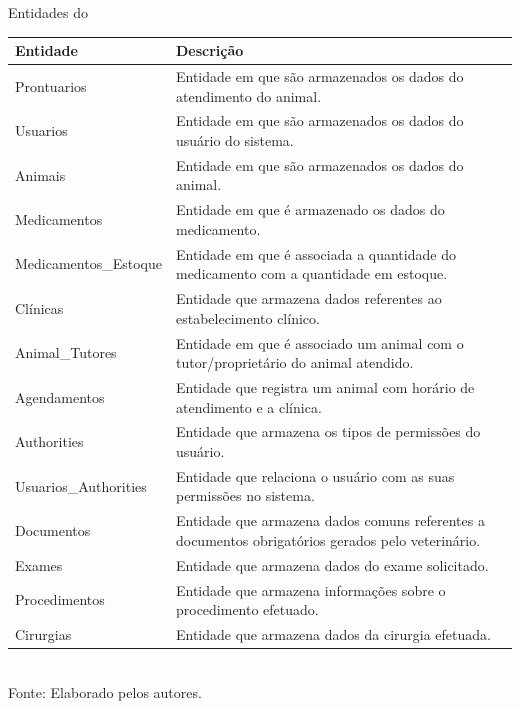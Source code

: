 \documentclass[
    12pt,               %
    openright,          %
    oneside,
    a4paper,            %
    BIBLATEX,           %
    TODO,               %
    english,            %
    brazil              %
    ]{ifsp-spo-inf-ctds}
\begin{document}
            \begin{center}
                \begin{quadro}[H]
                \centering
                \caption{Entidades do  }
                \begin{tabulary}{1.0\textwidth}{|p{10em}|p{26em}|}
                \hline
                Entidade & Descrição\\
                \hline
                Prontuarios & Entidade em que são armazenados os dados do atendimento do animal. \\
                \hline
                Usuarios & Entidade em que são armazenados os dados do usuário do sistema.\\
                \hline
                Animais & Entidade em que são armazenados os dados do animal.\\
                \hline
                Medicamentos & Entidade em que é armazenado os dados do medicamento.\\
                \hline
                Medicamentos\_Estoque & Entidade em que é associada a quantidade do medicamento com a quantidade em estoque.\\
                \hline
                Clínicas & Entidade que armazena dados referentes ao estabelecimento clínico.\\
                \hline
                Animal\_Tutores & Entidade em que é associado um animal com o tutor/proprietário do animal atendido.\\
                \hline
                Agendamentos & Entidade que registra um animal com horário de atendimento e a clínica.\\
                \hline
                Authorities & Entidade que armazena os tipos de permissões do usuário.\\
                \hline
                Usuarios\_Authorities & Entidade que relaciona o usuário com as suas permissões no sistema.\\
                \hline
                Documentos & Entidade que armazena dados comuns referentes a documentos obrigatórios gerados pelo veterinário.\\
                \hline
                Exames & Entidade que armazena dados do exame solicitado.\\
                \hline
                Procedimentos & Entidade que armazena informações sobre o procedimento efetuado.\\
                \hline
                Cirurgias & Entidade que armazena dados da cirurgia efetuada.\\
                \hline
                \end{tabulary}
                \label{tab: entidades} \\
                \centering
                {\footnotesize Fonte: Elaborado pelos autores.}
                \end{quadro}
            \end{center}  
\end{document}
